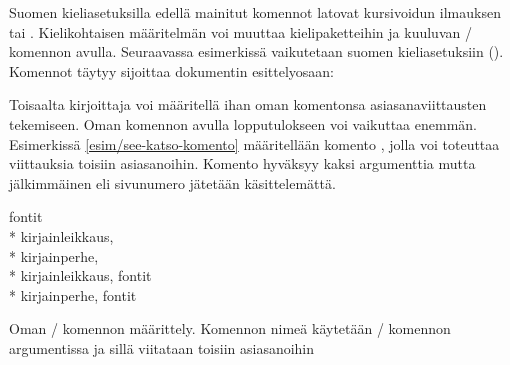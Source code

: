Suomen kieliasetuksilla edellä mainitut komennot latovat kursivoidun
ilmauksen \textit{\seename} tai \textit{\alsoname}. Kielikohtaisen
määritelmän voi muuttaa kielipaketteihin  ja
 kuuluvan \-/ komennon avulla. Seuraavassa
esimerkissä vaikutetaan suomen kieliasetuksiin
(). Komennot täytyy sijoittaa dokumentin
esittelyosaan:

\begin{koodilohkosis}
\addto{\captionsfinnish}{
  \renewcommand{\seename}{katso}
  \renewcommand{\alsoname}{katso myös}
}
\end{koodilohkosis}

\noindent
Toisaalta kirjoittaja voi määritellä ihan oman komentonsa
asiasanaviittausten tekemiseen. Oman komennon avulla lopputulokseen voi
vaikuttaa enemmän. Esimerkissä \ref{esim/see-katso-komento} määritellään
komento , jolla voi toteuttaa viittauksia toisiin
asiasanoihin. Komento hyväksyy kaksi argumenttia mutta jälkimmäinen eli
sivunumero jätetään käsittelemättä.

\begin{esimerkki*}

\begin{koodilohko}
\newcommand{\katso}[2]{\textrightarrow{} #1}


\end{koodilohko}

\begin{tulos}
  fontit \\*
  \makebox[\sisennys]{}kirjainleikkaus,  \\*
  \makebox[\sisennys]{}kirjainperhe,  \\*
  kirjainleikkaus, \textrightarrow{} fontit \\*
  kirjainperhe, \textrightarrow{} fontit
\end{tulos}

\caption{Oman \-/ komennon määrittely. Komennon nimeä
  käytetään \-/ komennon argumentissa ja sillä viitataan
  toisiin asiasanoihin}
\label{esim/see-katso-komento}
\end{esimerkki*}

